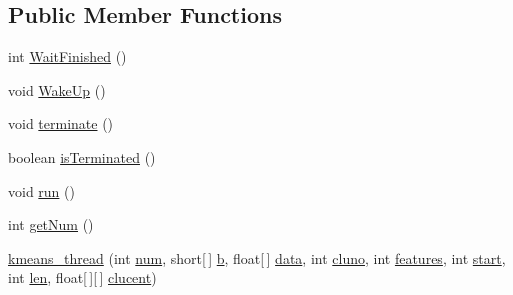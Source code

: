 \subsection*{Public Member Functions}
\begin{DoxyCompactItemize}
\item 
int \mbox{\hyperlink{classcom_1_1example_1_1dmocl_1_1kmeans_1_1kmeans__thread_aa8f43584029902ea0228b858a6968c5c}{Wait\+Finished}} ()
\item 
void \mbox{\hyperlink{classcom_1_1example_1_1dmocl_1_1kmeans_1_1kmeans__thread_a86d2aa68bb5b6972cb11a86e20443c38}{Wake\+Up}} ()
\item 
void \mbox{\hyperlink{classcom_1_1example_1_1dmocl_1_1kmeans_1_1kmeans__thread_aa26c51f9c4e5cd630b691cf0eea7aebb}{terminate}} ()
\item 
boolean \mbox{\hyperlink{classcom_1_1example_1_1dmocl_1_1kmeans_1_1kmeans__thread_a20f4eca42b1aaf0e77b1218f79aca3d6}{is\+Terminated}} ()
\item 
void \mbox{\hyperlink{classcom_1_1example_1_1dmocl_1_1kmeans_1_1kmeans__thread_a9aa3126e3df8223ad544f9ef022758ea}{run}} ()
\item 
int \mbox{\hyperlink{classcom_1_1example_1_1dmocl_1_1kmeans_1_1kmeans__thread_a9b6287b7f3f7b1e2043618a8227b391d}{get\+Num}} ()
\item 
\mbox{\hyperlink{classcom_1_1example_1_1dmocl_1_1kmeans_1_1kmeans__thread_accf2b8063de142790863073f2d4fc02b}{kmeans\+\_\+thread}} (int \mbox{\hyperlink{classcom_1_1example_1_1dmocl_1_1kmeans_1_1kmeans__thread_a7c5a94a9fe10aa2c30fdfa412dd063aa}{num}}, short\mbox{[}$\,$\mbox{]} \mbox{\hyperlink{classcom_1_1example_1_1dmocl_1_1kmeans_1_1kmeans__thread_a70723446065bed203819235225d8872a}{b}}, float\mbox{[}$\,$\mbox{]} \mbox{\hyperlink{classcom_1_1example_1_1dmocl_1_1kmeans_1_1kmeans__thread_a43f4f667e4e1e3a8a5576b8dfe3e4470}{data}}, int \mbox{\hyperlink{classcom_1_1example_1_1dmocl_1_1kmeans_1_1kmeans__thread_a679f4f01536ffdfb0855fab1d8f73a76}{cluno}}, int \mbox{\hyperlink{classcom_1_1example_1_1dmocl_1_1kmeans_1_1kmeans__thread_a70008d8c428171988cd60ff99f4155ac}{features}}, int \mbox{\hyperlink{classcom_1_1example_1_1dmocl_1_1kmeans_1_1kmeans__thread_aed0c23150d7c6b6c7d4ed35b210b799f}{start}}, int \mbox{\hyperlink{classcom_1_1example_1_1dmocl_1_1kmeans_1_1kmeans__thread_a7ed367dca687e507dec270455f128249}{len}}, float\mbox{[}$\,$\mbox{]}\mbox{[}$\,$\mbox{]} \mbox{\hyperlink{classcom_1_1example_1_1dmocl_1_1kmeans_1_1kmeans__thread_a9dd4b0dd6effc56f5971076e6448c5ec}{clucent}})
\end{DoxyCompactItemize}
